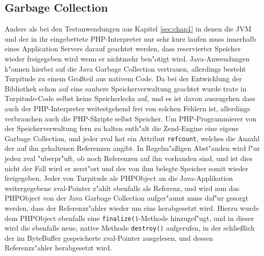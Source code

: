 \subsection{Garbage Collection}
\label{sec:chap2:turp:zendgc}

Anders als bei den Testanwendungen aus Kapitel \ref{sec:chap1} in denen die JVM und der in ihr eingebettete PHP-Interpreter
nur sehr kurz laufen muss innerhalb eines Application Servers darauf geachtet werden, dass reservierter Speicher
wieder freigegeben wird wenn er nichtmehr ben"otigt wird. Java-Anwendungen k"onnen hierbei auf die Java Garbage Collection
vertrauen, allerdings besteht Turpitude zu einem Gro\ss teil aus nativem Code. Da bei der Entwicklung der Bibliothek schon
auf eine saubere Speicherverwaltung geachtet wurde trate in Turpitude-Code selbst keine Speicherlecks auf, und es ist
davon auszugehen dass auch der PHP-Interpreter weitestgehend frei von solchen Fehlern ist, allerdings verbrauchen auch
die PHP-Skripte selbst Speicher. Um PHP-Programmierer von der Speicherverwaltung fern zu halten enth"alt die Zend-Engine 
eine eigene Garbage Collection, und jeder zval hat ein Attribut \texttt{refcount}, welches die Anzahl der auf ihn gehaltenen
Referenzen angibt. In Regelm"a\ss igen Abst"anden wird f"ur jeden zval "uberpr"uft, ob noch Referenzen auf ihn vorhanden sind,
und ist dies nicht der Fall wird er zerst"ort und der von ihm belegte Speicher somit wieder freigegeben.
Jeder von Turpitude als PHPObject an die Java-Applikation weitergegebene zval-Pointer z"ahlt ebenfalls als Referenz,
und wird nun das PHPObject von der Java Garbage Collection aufger"aumt muss daf"ur gesorgt werden, dass der
Referenzz"ahler wieder um eins herabgesetzt wird.
Hierzu wurde dem PHPObject ebenfalls eine \texttt{finalize()}-Methode hinzugef"ugt, und in dieser wird die ebenfalls neue,
native Methode \texttt{destroy()} aufgerufen, in der schlie\ss lich der im ByteBuffer gespeicherte zval-Pointer
ausgelesen, und dessen Referenzz"ahler herabgesetzt wird.



